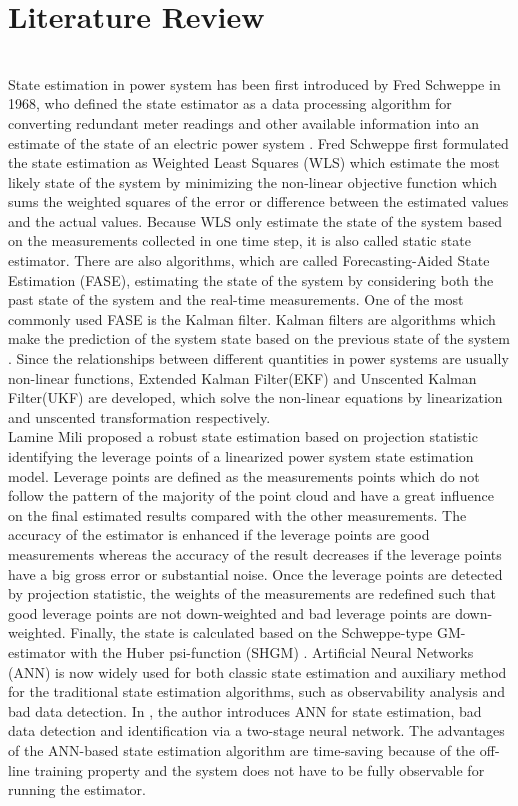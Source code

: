 \section{Literature Review}
\\State estimation in power system has been first introduced by Fred Schweppe in 1968, who defined the state estimator as a data processing algorithm for converting redundant meter readings and other available information into an estimate of the state of an electric power system
\cite{wu1990power}. Fred Schweppe first formulated the state estimation as Weighted Least Squares (WLS) which estimate the most likely state of the system by minimizing the non-linear objective function which sums the weighted squares of the error or difference between the estimated values and the actual values. Because WLS only estimate the state of the system based on the measurements collected in one time step, it is also called static state estimator. 
There are also algorithms, which are called Forecasting-Aided State Estimation (FASE), estimating the state of the system by considering both the past state of the system and the real-time measurements. One of the most commonly used FASE is the Kalman filter. Kalman filters are algorithms which make the prediction of the system state based on the previous state of the system
\cite{umamageswari2012comparitive}.
 Since the relationships between different quantities in power systems are usually non-linear functions, Extended Kalman Filter(EKF) and Unscented Kalman Filter(UKF) are developed, which solve the non-linear equations by linearization and unscented transformation respectively. 
 \bigskip
 \\Lamine Mili proposed a robust state estimation based on projection statistic identifying the leverage points of a linearized power system state estimation model. Leverage points are defined as the measurements points which do not follow the pattern of the majority of the point cloud and have a great influence on the final estimated results compared with the other measurements. The accuracy of the estimator is enhanced if the leverage points are good measurements whereas the accuracy of the result decreases if the leverage points have a big gross error or substantial noise. Once the leverage points are detected by projection statistic, the weights of the measurements are redefined such that good leverage points are not down-weighted and bad leverage points are down-weighted. Finally, the state is calculated based on the Schweppe-type GM-estimator with the Huber psi-function (SHGM)
\cite{mili1996robust}.
Artificial Neural Networks (ANN) is now widely used for both classic state estimation and auxiliary method for the traditional state estimation algorithms, such as observability analysis and bad data detection. In
\cite{manitsas2012distribution}, the author introduces ANN for state estimation, bad data detection and identification via a two-stage neural network. The advantages of the ANN-based state estimation algorithm are time-saving because of the off-line training property and the system does not have to be fully observable for running the estimator.

